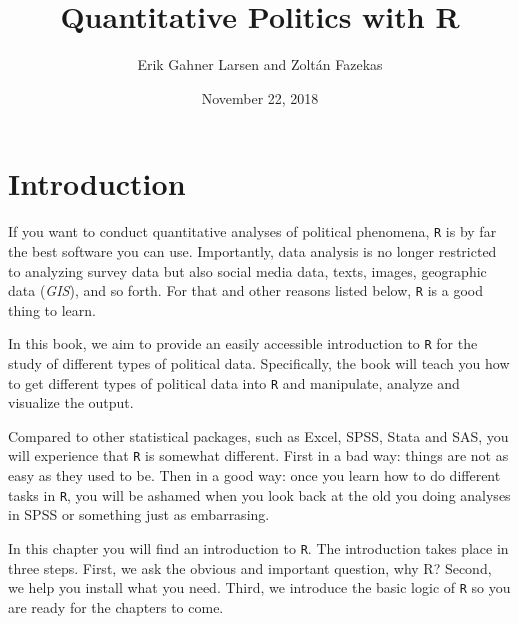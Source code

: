 \documentclass[12pt,oneside]{reedthesis}
\title{\Huge{ Quantitative Politics with R } \vspace{2em}}
\author{Erik Gahner Larsen and Zoltán Fazekas}
\date{November 22, 2018}
\theoremstyle{definition}
\theoremstyle{definition}
\theoremstyle{definition}
\theoremstyle{remark}
\begin{document}
      \maketitle
  
  \frontmatter %
  \pagestyle{empty} %

  
  
      \hypersetup{linkcolor=black}
    \setcounter{tocdepth}{2}
    \tableofcontents
  
  
  
  
  
  \mainmatter %
  \pagestyle{fancyplain} %

  \chapter{Introduction}\label{introduction}
  
  If you want to conduct quantitative analyses of political phenomena,
  \texttt{R} is by far the best software you can use. Importantly, data
  analysis is no longer restricted to analyzing survey data but also
  social media data, texts, images, geographic data (\emph{GIS}), and so
  forth. For that and other reasons listed below, \texttt{R} is a good
  thing to learn.
  
  In this book, we aim to provide an easily accessible introduction to
  \texttt{R} for the study of different types of political data.
  Specifically, the book will teach you how to get different types of
  political data into \texttt{R} and manipulate, analyze and visualize the
  output.
  
  Compared to other statistical packages, such as Excel, SPSS, Stata and
  SAS, you will experience that \texttt{R} is somewhat different. First in
  a bad way: things are not as easy as they used to be. Then in a good
  way: once you learn how to do different tasks in \texttt{R}, you will be
  ashamed when you look back at the old you doing analyses in SPSS or
  something just as embarrasing.
  
  In this chapter you will find an introduction to \texttt{R}. The
  introduction takes place in three steps. First, we ask the obvious and
  important question, why R? Second, we help you install what you need.
  Third, we introduce the basic logic of \texttt{R} so you are ready for
  the chapters to come.
  
\end{document}
